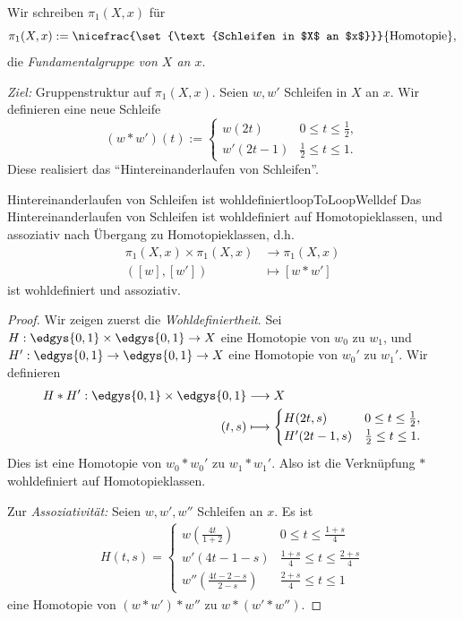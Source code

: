 \documentclass[language=ngerman]{TemplateLecture} %
\begin{document}
Wir schreiben $\pi_1(X, x)$ für 
\begin{equation*}
    \pi_1(X,x) := \nicefrac{\set{\text{Schleifen in $X$ an $x$}}}{\text{Homotopie}},
\end{equation*}
die \emph{Fundamentalgruppe von $X$ an $x$}.

\emph{Ziel:} Gruppenstruktur auf $\pi_1(X,x)$. Seien $w, w'$ Schleifen in $X$ an $x$. Wir definieren eine neue Schleife 
\begin{equation*}
    (w * w')(t) := \begin{cases}
        w(2t) & 0 \leq t \leq \frac{1}{2}, \\
        w'(2t - 1) & \frac{1}{2} \leq t \leq 1.
    \end{cases}
\end{equation*}
Diese realisiert das \enquote{Hintereinanderlaufen von Schleifen}.

\begin{thm}{Hintereinanderlaufen von Schleifen ist wohldefiniert}{loopToLoopWelldef}
    Das Hintereinanderlaufen von Schleifen ist wohldefiniert auf Homotopieklassen, und assoziativ nach Übergang zu Homotopieklassen, d.h. 
    \begin{align*}
        \pi_1(X, x) \times \pi_1(X, x) & \longrightarrow \pi_1(X,x) \\
        ([w], [w']) &\longmapsto [w * w']
    \end{align*}
    ist wohldefiniert und assoziativ.
\end{thm}

\begin{proof}
    Wir zeigen zuerst die \emph{Wohldefiniertheit}. Sei $H: \edgys{0,1} \times \edgys{0,1} \to X$ eine Homotopie von $w_0$ zu $w_1$, und $H': \edgys{0,1} \to \edgys{0,1} \to X$ eine Homotopie von $w_0'$ zu $w_1'$. Wir definieren 
    \begin{align*}
        H * H' : \edgys{0,1} \times \edgys{0,1} &\longrightarrow X \\
        (t,s) &\longmapsto \begin{cases}
            H(2t, s) & 0 \leq t \leq \frac{1}{2}, \\
            H'(2t - 1, s) & \frac{1}{2} \leq t \leq 1.
        \end{cases}
    \end{align*}
    Dies ist eine Homotopie von $w_0 * w_0'$ zu $w_1 * w_1'$. Also ist die Verknüpfung $*$ wohldefiniert auf Homotopieklassen.

    Zur \emph{Assoziativität:} Seien $w, w', w''$ Schleifen an $x$. Es ist 
    \begin{align*}
        H(t,s) = \begin{cases}
            w\left(\frac{4t}{1+2}\right) & 0 \leq t \leq \frac{1+s}{4} \\
            w'(4t-1-s) & \frac{1+s}{4}\leq t \leq \frac{2+s}{4} \\
            w''\left(\frac{4t-2-s}{2-s}\right) & \frac{2+s}{4} \leq t \leq 1
        \end{cases}
    \end{align*} 
    eine Homotopie von $(w * w') * w''$ zu $w * (w' * w'')$.
\end{proof}
\end{document}
